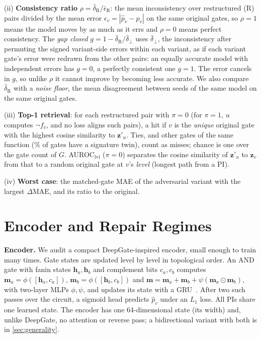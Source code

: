 \noindent(ii) \textbf{Consistency ratio} $\rho=\bar\delta_{\mathrm{R}}/\bar\epsilon_{\mathrm{R}}$: the mean
inconsistency over restructured (R) pairs divided by the mean error $\epsilon_v=|\hat p_v-p_v|$ on the same
original gates, so $\rho=1$ means the model moves by as much as it errs and $\rho=0$ means perfect
consistency. The \emph{gap closed} $g=1-\bar\delta_{\mathrm{R}}/\bar\delta_\perp$ uses $\bar\delta_\perp$, the
inconsistency after permuting the signed variant-side errors within each variant, as if each variant gate's error were redrawn
from the other pairs: an
equally accurate model with independent errors has $g=0$, a perfectly consistent one $g=1$. The error cancels in
$g$, so unlike $\rho$ it cannot improve by becoming less accurate. We also compare
$\bar\delta_{\mathrm{R}}$ with a \emph{noise floor}, the mean disagreement between seeds of the same model on the
same original gates.

\noindent(iii) \textbf{Top-1 retrieval}: for each restructured pair with $\pi=0$ (for $\pi=1$, $u$ computes
$\neg f_v$, and no loss aligns such pairs), a hit if $v$ is the \emph{unique}
original gate with the highest cosine similarity to $\mathbf z'_u$. Ties, and other gates of the same
function (\DupTwinPct\% of gates have a signature twin), count as misses; chance is one over the gate count of $G$.
AUROC$_\mathrm{lvl}$ ($\pi=0$) separates the cosine similarity of $\mathbf z'_u$ to $\mathbf z_v$ from that
to a random original gate at $v$'s \emph{level} (longest path from a PI).

\noindent(iv) \textbf{Worst case}: the matched-gate MAE of the adversarial variant with the largest
$\Delta\mathrm{MAE}$, and its ratio to the original.

\section{Encoder and Repair Regimes}\label{sec:models}
\noindent\textbf{Encoder.} We audit a compact DeepGate-inspired encoder, small enough to train many times.
Gate states are updated level by level in topological order. An AND gate with fanin states $\mathbf h_a,\mathbf h_b$
and complement bits $c_a,c_b$ computes $\mathbf m_a=\phi([\mathbf h_a,c_a])$, $\mathbf m_b=\phi([\mathbf h_b,c_b])$ and
$\mathbf m=\mathbf m_a+\mathbf m_b+\psi(\mathbf m_a\odot\mathbf m_b)$, with two-layer MLPs $\phi,\psi$, and updates its
state with a GRU~\cite{DBLP:conf/emnlp/ChoMGBBSB14}. After two such passes over the circuit, a sigmoid head predicts $\hat p_v$ under an
$L_1$ loss. All PIs share one learned state. The encoder has one 64-dimensional state (its width) and, unlike DeepGate, no attention
or reverse pass; a bidirectional variant with both is in \cref{sec:generality}.

